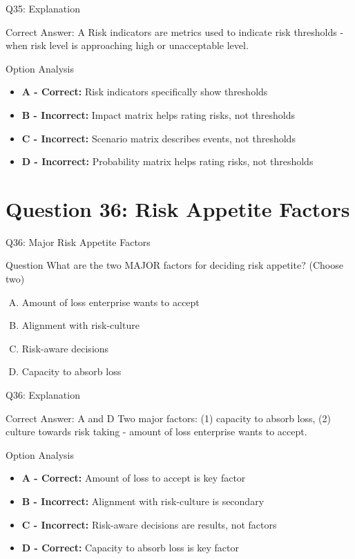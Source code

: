 \documentclass{beamer}
\begin{document}
	\begin{frame}{Q35: Explanation}
		\begin{block}{Correct Answer: A}
			Risk indicators are metrics used to indicate risk thresholds - when risk level is approaching high or unacceptable level.
		\end{block}
		\begin{block}{Option Analysis}
			\begin{itemize}
				\item \textbf{A - Correct:} Risk indicators specifically show thresholds
				\item \textbf{B - Incorrect:} Impact matrix helps rating risks, not thresholds
				\item \textbf{C - Incorrect:} Scenario matrix describes events, not thresholds
				\item \textbf{D - Incorrect:} Probability matrix helps rating risks, not thresholds
			\end{itemize}
		\end{block}
	\end{frame}
	
	\section{Question 36: Risk Appetite Factors}
	
	\begin{frame}{Q36: Major Risk Appetite Factors}
		\begin{block}{Question}
			What are the two MAJOR factors for deciding risk appetite? (Choose two)
		\end{block}
		\begin{enumerate}[(A)]
			\item Amount of loss enterprise wants to accept
			\item Alignment with risk-culture
			\item Risk-aware decisions
			\item Capacity to absorb loss
		\end{enumerate}
	\end{frame}
	
	\begin{frame}{Q36: Explanation}
		\begin{block}{Correct Answer: A and D}
			Two major factors: (1) capacity to absorb loss, (2) culture towards risk taking - amount of loss enterprise wants to accept.
		\end{block}
		\begin{block}{Option Analysis}
			\begin{itemize}
				\item \textbf{A - Correct:} Amount of loss to accept is key factor
				\item \textbf{B - Incorrect:} Alignment with risk-culture is secondary
				\item \textbf{C - Incorrect:} Risk-aware decisions are results, not factors
				\item \textbf{D - Correct:} Capacity to absorb loss is key factor
			\end{itemize}
		\end{block}
	\end{frame}
	
\end{document}
